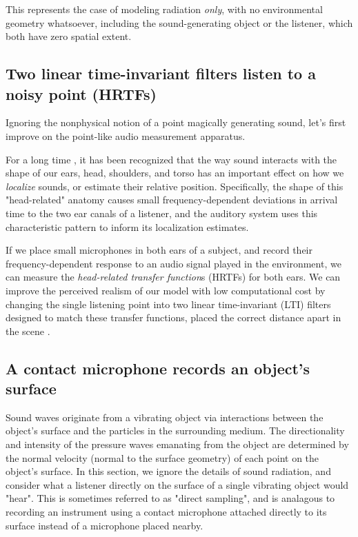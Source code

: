 \documentclass[12pt]{article}
\begin{document}
This represents the case of modeling radiation \textit{only}, with no environmental geometry whatsoever, including the sound-generating object or the listener, which both have zero spatial extent.

\subsection{Two linear time-invariant filters listen to a noisy point (HRTFs)}

Ignoring the nonphysical notion of a point magically generating sound, let's first improve on the point-like audio measurement apparatus.

For a long time \cite{starch_perimetry_1908}, it has been recognized that the way sound interacts with the shape of our ears, head, shoulders, and torso has an important effect on how we \textit{localize} sounds, or estimate their relative position.
Specifically, the shape of this "head-related" anatomy causes small frequency-dependent deviations in arrival time to the two ear canals of a listener, and the auditory system uses this characteristic pattern to inform its localization estimates.

If we place small microphones in both ears of a subject, and record their frequency-dependent response to an audio signal played in the environment, we can measure the \textit{head-related transfer function}s (HRTFs) for both ears.
We can improve the perceived realism of our model with low computational cost by changing the single listening point into two linear time-invariant (LTI) filters designed to match these transfer functions, placed the correct distance apart in the scene \cite{so_surround_2006}.

\subsection{A contact microphone records an object's surface}

Sound waves originate from a vibrating object via interactions between the object's surface and the particles in the surrounding medium.
The directionality and intensity of the pressure waves emanating from the object are determined by the normal velocity (normal to the surface geometry) of each point on the object's surface.
In this section, we ignore the details of sound radiation, and consider what a listener directly on the surface of a single vibrating object would "hear".
This is sometimes referred to as "direct sampling", and is analagous to recording an instrument using a contact microphone attached directly to its surface instead of a microphone placed nearby.
\end{document}
